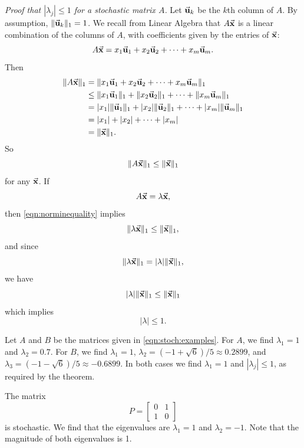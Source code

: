 \emph{Proof that $|\lambda_j|\le 1$ for a stochastic matrix $A$.}
Let $\vec{\textbf{u}}_k$ be the $k$th column of $A$.
By assumption, $\|\vec{\textbf{u}}_k\|_1 = 1$.
We recall from Linear Algebra that
$A\vec{\textbf{x}}$ is a linear combination of the columns of $A$, with
coefficients given by the entries of $\vec{\textbf{x}}$:
\begin{equation}
  A\vec{\textbf{x}} = x_1 \vec{\textbf{u}}_1 + x_2\vec{\textbf{u}}_2 + \cdots + x_m \vec{\textbf{u}}_m.
\end{equation}
Then
\begin{equation}
\begin{split}
  \|A\vec{\textbf{x}}\|_1 & = \|x_1\vec{\textbf{u}}_1 + x_2 \vec{\textbf{u}}_2 + \cdots + x_m\vec{\textbf{u}}_m\|_1 \\
             & \le \|x_1 \vec{\textbf{u}}_1\|_1 + \|x_2 \vec{\textbf{u}}_2\|_1 + \cdots + \| x_m \vec{\textbf{u}}_m\|_1 \\
	     & = |x_1|\|\vec{\textbf{u}}_1\|_1 + |x_2|\|\vec{\textbf{u}}_2\|_1 + \cdots + |x_m|\|\vec{\textbf{u}}_m\|_1 \\
	     & = |x_1| + |x_2| + \cdots + |x_m| \\
	     & = \|\vec{\textbf{x}}\|_1.
\end{split}
\end{equation}
So
\begin{equation}
\|A\vec{\textbf{x}}\|_1 \le \|\vec{\textbf{x}}\|_1
\label{eqn:norminequality}
\end{equation}
for any $\vec{\textbf{x}}$.  If
\begin{equation}
  A\vec{\textbf{x}} = \lambda \vec{\textbf{x}},
\end{equation}
then \eqref{eqn:norminequality} implies
\begin{equation}
  \|\lambda\vec{\textbf{x}}\|_1 \le \|\vec{\textbf{x}}\|_1,
\end{equation}
and since
\begin{equation}
  \|\lambda \vec{\textbf{x}}\|_1 = |\lambda|\|\vec{\textbf{x}}\|_1,
\end{equation}
we have
\begin{equation}
 |\lambda| \|\vec{\textbf{x}}\|_1 \le \|\vec{\textbf{x}}\|_1
\end{equation}
which implies
\begin{equation}
 |\lambda| \le 1.
\end{equation}
\begin{xexample}
Let $A$ and $B$ be the matrices given in \eqref{eqn:stoch:examples}.
For $A$, we find $\lambda_1 = 1$ and $\lambda_2 = 0.7$.
For $B$, we find $\lambda_1 = 1$,
$\lambda_2 = (-1+\sqrt{6})/5 \approx 0.2899$,
and $\lambda_3 = (-1-\sqrt{6})/5 \approx -0.6899$.
In both cases we find $\lambda_1=1$ and $|\lambda_j|\le 1$, as
required by the theorem.
\end{xexample}
\begin{xexample}
The matrix
\begin{equation}
  P = \begin{bmatrix}
          0 & 1 \\
	  1 & 0
      \end{bmatrix}
\end{equation}
is stochastic. We find that the eigenvalues
are $\lambda_1 = 1$ and $\lambda_2 = -1$.
Note that the magnitude of both eigenvalues is 1.
\end{xexample}
